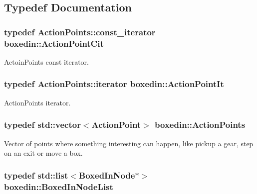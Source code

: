 \subsection{Typedef Documentation}
\hypertarget{namespaceboxedin_a1d095c548e50d28c4901ac9f46c8aee1}{
\subsubsection[{Action\+Point\+Cit}]{\setlength{\rightskip}{0pt plus 5cm}typedef Action\+Points\+::const\+\_\+iterator {\bf boxedin\+::\+Action\+Point\+Cit}}}\label{namespaceboxedin_a1d095c548e50d28c4901ac9f46c8aee1}
Actoin\+Points const iterator. \hypertarget{namespaceboxedin_ad689efceb1168fa307cd39a22a6e9ad4}{
\subsubsection[{Action\+Point\+It}]{\setlength{\rightskip}{0pt plus 5cm}typedef Action\+Points\+::iterator {\bf boxedin\+::\+Action\+Point\+It}}}\label{namespaceboxedin_ad689efceb1168fa307cd39a22a6e9ad4}
Action\+Points iterator. \hypertarget{namespaceboxedin_ac5c79d0ac76a1a0ac73706f34abe3fc3}{
\subsubsection[{Action\+Points}]{\setlength{\rightskip}{0pt plus 5cm}typedef std\+::vector$<${\bf Action\+Point}$>$ {\bf boxedin\+::\+Action\+Points}}}\label{namespaceboxedin_ac5c79d0ac76a1a0ac73706f34abe3fc3}
Vector of points where something interesting can happen, like pickup a gear, step on an exit or move a box. \hypertarget{namespaceboxedin_a01412e7e38b44e8ce2d9f0d67d142219}{
\subsubsection[{Boxed\+In\+Node\+List}]{\setlength{\rightskip}{0pt plus 5cm}typedef std\+::list$<${\bf Boxed\+In\+Node}$\ast$$>$ {\bf boxedin\+::\+Boxed\+In\+Node\+List}}}\label{namespaceboxedin_a01412e7e38b44e8ce2d9f0d67d142219}
